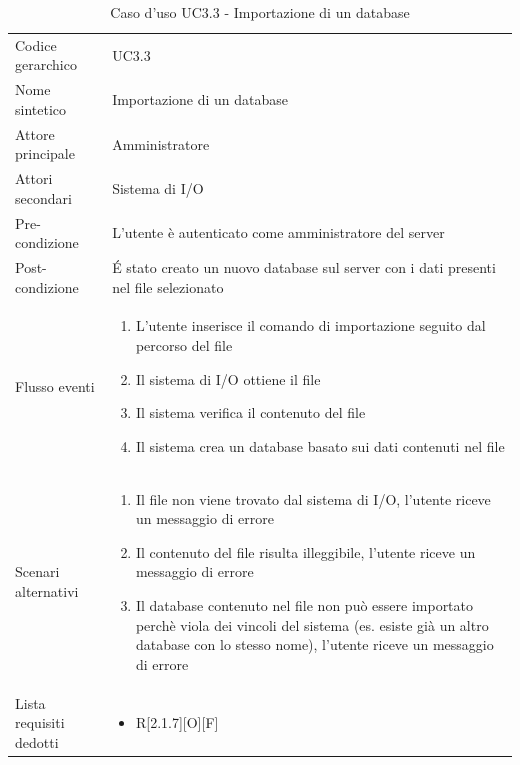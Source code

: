 \documentclass[a4paper]{report}
\begin{document}
		\begin{table}[H]
		\begin{tabularx}{\textwidth}{X | X}\toprule
			\rowcolor{orange!65}Codice gerarchico & UC3.3 \\
			Nome sintetico & Importazione di un database \\
			\rowcolor{orange!65}Attore principale & Amministratore\\
			Attori secondari & Sistema di I/O \\
			\rowcolor{orange!65}Pre-condizione & L'utente è autenticato come amministratore del server\\
			Post-condizione & \'E stato creato un nuovo database sul server con i dati presenti nel file
			selezionato \\
			\rowcolor{orange!65}Flusso eventi & \begin{enumerate}
			\item L'utente inserisce il comando di importazione seguito dal percorso del file 
			\item Il sistema di I/O ottiene il file
			\item Il sistema verifica il contenuto del file
			\item Il sistema crea un database basato sui dati contenuti nel file
			\end{enumerate} \\
			Scenari alternativi & \begin{enumerate}
			\item Il file non viene trovato dal sistema di I/O, l'utente riceve un messaggio di errore
			\item Il contenuto del file risulta illeggibile, l'utente riceve un messaggio di errore
			\item Il database contenuto nel file non può essere importato perchè viola dei vincoli del sistema 
			(es. esiste già un altro database con lo stesso nome), l'utente riceve un messaggio di errore
			\end{enumerate} \\
			\rowcolor{orange!65}Lista requisiti dedotti & \begin{itemize}
			\item R[2.1.7][O][F]
			\end{itemize} \\
			\bottomrule
		\end{tabularx}
		\caption{Caso d'uso UC3.3 - Importazione di un database}
	 \end{table}
\end{document}
